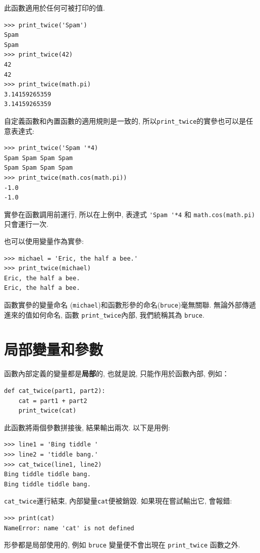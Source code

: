 \documentclass[10pt]{book}
\begin{document}
此函數適用於任何可被打印的值. 

\begin{verbatim}
>>> print_twice('Spam')
Spam
Spam
>>> print_twice(42)
42
42
>>> print_twice(math.pi)
3.14159265359
3.14159265359
\end{verbatim}
%
自定義函數和內置函數的適用規則是一致的, 
所以\verb"print_twice"的實參也可以是任意表達式:

\begin{verbatim}
>>> print_twice('Spam '*4)
Spam Spam Spam Spam
Spam Spam Spam Spam
>>> print_twice(math.cos(math.pi))
-1.0
-1.0
\end{verbatim}
%
實參在函數調用前運行, 所以在上例中, 表達式 \verb"'Spam '*4" 和
{\tt math.cos(math.pi)} 只會運行一次. 

也可以使用變量作為實參:

\begin{verbatim}
>>> michael = 'Eric, the half a bee.'
>>> print_twice(michael)
Eric, the half a bee.
Eric, the half a bee.
\end{verbatim}
%
函數實參的變量命名 ({\tt michael})和函數形參的命名({\tt bruce})毫無關聯. 
無論外部傳遞進來的值如何命名, 函數 \verb"print_twice"內部, 我們統稱其為 {\tt bruce}. 


\section{局部變量和參數}

函數內部定義的變量都是{\bf 局部}的, 也就是說, 只能作用於函數內部, 例如：

\begin{verbatim}
def cat_twice(part1, part2):
    cat = part1 + part2
    print_twice(cat)
\end{verbatim}
%
此函數將兩個參數拼接後, 結果輸出兩次. 以下是用例:

\begin{verbatim}
>>> line1 = 'Bing tiddle '
>>> line2 = 'tiddle bang.'
>>> cat_twice(line1, line2)
Bing tiddle tiddle bang.
Bing tiddle tiddle bang.
\end{verbatim}
%
\verb"cat_twice"運行結束, 內部變量{\tt cat}便被銷毀. 
如果現在嘗試輸出它, 會報錯:

\begin{verbatim}
>>> print(cat)
NameError: name 'cat' is not defined
\end{verbatim}
%
形參都是局部使用的, 例如 {\tt bruce} 變量便不會出現在 \verb"print_twice" 函數之外.
\end{document}
